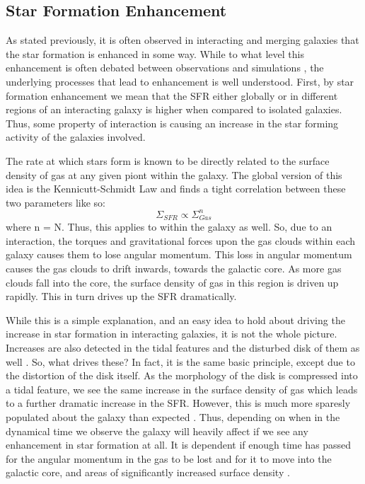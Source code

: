 \subsection{Star Formation Enhancement} 
\noindent As stated previously, it is often observed in interacting and merging galaxies that the star formation is enhanced in some way. While to what level this enhancement is often debated between observations \citep{} and simulations \citep{}, the underlying processes that lead to enhancement is well understood. First, by star formation enhancement we mean that the SFR either globally or in different regions of an interacting galaxy is higher when compared to isolated galaxies. Thus, some property of interaction is causing an increase in the star forming activity of the galaxies involved. 

The rate at which stars form is known to be directly related to the surface density of gas at any given piont within the galaxy. The global version of this idea is the Kennicutt-Schmidt Law \citep{Kennicutt-Schmidt paper} and finds a tight correlation between these two parameters like so:
\begin{equation}
	\Sigma_{SFR} \propto \Sigma_{Gas}^{n}
\end{equation}
where n = N. Thus, this applies to within the galaxy as well. So, due to an interaction, the torques and gravitational forces upon the gas clouds within each galaxy causes them to lose angular momentum. This loss in angular momentum causes the gas clouds to drift inwards, towards the galactic core. As more gas clouds fall into the core, the surface density of gas in this region is driven up rapidly. This in turn drives up the SFR dramatically.

While this is a simple explanation, and an easy idea to hold about driving the increase in star formation in interacting galaxies, it is not the whole picture. Increases are also detected in the tidal features and the disturbed disk of them as well \citep{Papers on increases in star formation in the galactic disk?}. So, what drives these? In fact, it is the same basic principle, except due to the distortion of the disk itself. As the morphology of the disk is compressed into a tidal feature, we see the same increase in the surface density of gas which leads to a further dramatic increase in the SFR. However, this is much more sparesly populated about the galaxy than expected \citep{What am I even saying here?}. Thus, depending on when in the dynamical time we observe the galaxy will heavily affect if we see any enhancement in star formation at all. It is dependent if enough time has passed for the angular momentum in the gas to be lost and for it to move into the galactic core, and areas of significantly increased surface density \citep{Seriously, am I even making any sense here?}.

